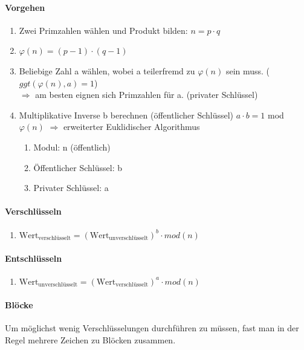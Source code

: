 \paragraph{Vorgehen}
\begin{enumerate}
	\item Zwei Primzahlen wählen und Produkt bilden: $n = p \cdot q$
	\item $\varphi(n) = (p - 1) \cdot (q - 1)$
	\item Beliebige Zahl a wählen, wobei a teilerfremd zu $\varphi(n)$ sein muss. ($ggt(\varphi(n), a) = 1$) \\ $\Rightarrow$ am besten eignen sich Primzahlen für a. (privater Schlüssel)
	\item Multiplikative Inverse b berechnen (öffentlicher Schlüssel) $a \cdot b = 1$ mod $\varphi(n)$ $\Rightarrow$ erweiterter Euklidischer Algorithmus
	\begin{enumerate}
		\item Modul: n (öffentlich)
		\item Öffentlicher Schlüssel: b
		\item Privater Schlüssel: a
	\end{enumerate}	
\end{enumerate}

\paragraph{Verschlüsseln}
\begin{enumerate}
	\item $\text{Wert}_\text{verschlüsselt} = (\text{Wert}_\text{unverschlüsselt})^{b} \cdot mod(n)$
\end{enumerate}

\paragraph{Entschlüsseln}
\begin{enumerate}
	\item $\text{Wert}_\text{unverschlüsselt} = (\text{Wert}_\text{verschlüsselt})^{a} \cdot mod(n)$
\end{enumerate}


\paragraph{Blöcke}
Um möglichst wenig Verschlüsselungen durchführen zu müssen, fast man in der Regel mehrere Zeichen zu Blöcken zusammen. 

